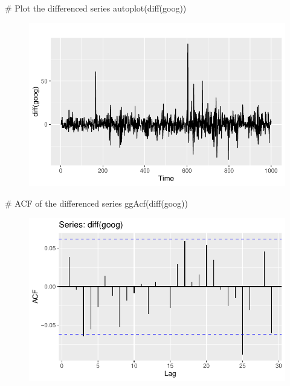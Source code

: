 \documentclass[
  letterpaper,
  DIV=11,
  numbers=noendperiod]{scrartcl}
\newenvironment{Shaded}{\begin{snugshade}}{\end{snugshade}}
\newcommand{\CommentTok}[1]{\textcolor[rgb]{0.37,0.37,0.37}{#1}}
\newcommand{\FunctionTok}[1]{\textcolor[rgb]{0.28,0.35,0.67}{#1}}
\newcommand{\NormalTok}[1]{\textcolor[rgb]{0.00,0.23,0.31}{#1}}
\begin{document}
\begin{Shaded}
\begin{Highlighting}[]
\CommentTok{\# Plot the differenced series}
\FunctionTok{autoplot}\NormalTok{(}\FunctionTok{diff}\NormalTok{(goog))}
\end{Highlighting}
\end{Shaded}

\begin{figure}[H]

{\centering \includegraphics{forecasting_datacamp_ex_files/figure-pdf/unnamed-chunk-6-2.pdf}

}

\end{figure}

\begin{Shaded}
\begin{Highlighting}[]
\CommentTok{\# ACF of the differenced series}
\FunctionTok{ggAcf}\NormalTok{(}\FunctionTok{diff}\NormalTok{(goog))}
\end{Highlighting}
\end{Shaded}

\begin{figure}[H]

{\centering \includegraphics{forecasting_datacamp_ex_files/figure-pdf/unnamed-chunk-6-3.pdf}

}

\end{figure}
\end{document}
